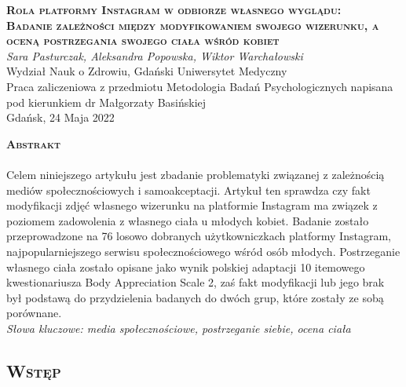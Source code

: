 \documentclass[12pt,a4paper,final,oneside,onecolumn,titlepage]{article}
\begin{document}
\pagestyle{fancy}
\fancyhead{}
\fancyfoot{}
\rhead{\thepage}

\begin{titlepage}
  \thispagestyle{empty}
  \begin{center}
  \vspace*{1cm}
  \Large
  \textbf{\textsc{Rola platformy Instagram w odbiorze własnego wyglądu:\\ Badanie zależności między modyfikowaniem swojego wizerunku, a oceną postrzegania swojego ciała wśród kobiet\\}}
  \vspace{1.5cm}
  \textit{Sara Pasturczak, Aleksandra Popowska, Wiktor Warchałowski\\}
  Wydział Nauk o Zdrowiu, Gdański Uniwersytet Medyczny\\
  \vspace{3cm}
  Praca zaliczeniowa z przedmiotu Metodologia Badań Psychologicznych napisana pod kierunkiem dr Małgorzaty Basińskiej\\
  \vspace{3cm}
  Gdańsk, 24 Maja 2022
  \end{center}
\end{titlepage}
\begin{center}
  \vspace*{0.5cm}
  \large{\textbf{\textsc{Abstrakt}}}
\end{center}
\paragraph{}
Celem niniejszego artykułu jest zbadanie problematyki związanej z zależnością mediów społecznościowych i samoakceptacji. Artykuł ten sprawdza czy fakt modyfikacji zdjęć własnego wizerunku na platformie Instagram ma związek z poziomem zadowolenia z własnego ciała u młodych kobiet. Badanie zostało przeprowadzone na 76 losowo dobranych użytkowniczkach platformy Instagram, najpopularniejszego serwisu społecznościowego wśród osób młodych. Postrzeganie własnego ciała zostało opisane jako wynik polskiej adaptacji 10 itemowego kwestionariusza Body Appreciation Scale 2, zaś fakt modyfikacji lub jego brak był podstawą do przydzielenia badanych do dwóch grup, które zostały ze sobą porównane.\\
\textit{Słowa kluczowe: media społecznościowe, postrzeganie siebie, ocena ciała}
\newpage
\begin{center}
\section*{\large{\textbf{\textsc{Wstęp}}}}
\end{center}
\end{document}
